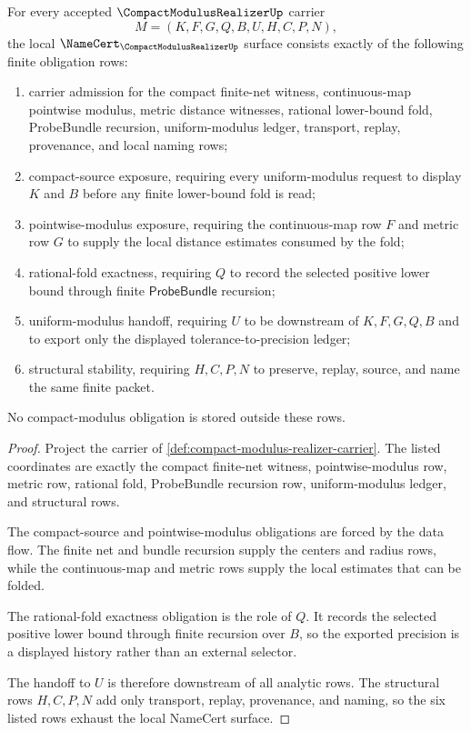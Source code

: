 \begin{theorem}
\label{thm:compact-modulus-realizer-namecert-obligations}
For every accepted $\CompactModulusRealizerUp$ carrier
$$
M=(K,F,G,Q,B,U,H,C,P,N),
$$
the local $\NameCert_{\CompactModulusRealizerUp}$ surface consists exactly of the following finite obligation rows:
\begin{enumerate}
\item carrier admission for the compact finite-net witness, continuous-map pointwise modulus, metric distance witnesses, rational lower-bound fold, ProbeBundle recursion, uniform-modulus ledger, transport, replay, provenance, and local naming rows;
\item compact-source exposure, requiring every uniform-modulus request to display $K$ and $B$ before any finite lower-bound fold is read;
\item pointwise-modulus exposure, requiring the continuous-map row $F$ and metric row $G$ to supply the local distance estimates consumed by the fold;
\item rational-fold exactness, requiring $Q$ to record the selected positive lower bound through finite $\mathsf{ProbeBundle}$ recursion;
\item uniform-modulus handoff, requiring $U$ to be downstream of $K,F,G,Q,B$ and to export only the displayed tolerance-to-precision ledger;
\item structural stability, requiring $H,C,P,N$ to preserve, replay, source, and name the same finite packet.
\end{enumerate}
No compact-modulus obligation is stored outside these rows.
\end{theorem}
\begin{proof}
Project the carrier of \autoref{def:compact-modulus-realizer-carrier}. The listed coordinates are exactly the compact finite-net witness, pointwise-modulus row, metric row, rational fold, ProbeBundle recursion row, uniform-modulus ledger, and structural rows.

The compact-source and pointwise-modulus obligations are forced by the data flow. The finite net and bundle recursion supply the centers and radius rows, while the continuous-map and metric rows supply the local estimates that can be folded.

The rational-fold exactness obligation is the role of $Q$. It records the selected positive lower bound through finite recursion over $B$, so the exported precision is a displayed history rather than an external selector.

The handoff to $U$ is therefore downstream of all analytic rows. The structural rows $H,C,P,N$ add only transport, replay, provenance, and naming, so the six listed rows exhaust the local NameCert surface.
\end{proof}

